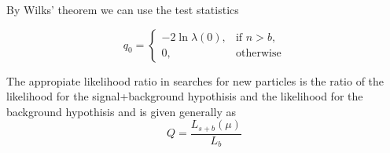 \documentclass[../../main/main.tex]{subfiles}
\begin{document}
By Wilks' theorem we can use the test statistics 

\begin{equation}
  \label{eq:wilks-test}
  q_0=\begin{cases}
             -2\ln \lambda(0), & \text{if \(n > b\),}\\
             0, & \text{otherwise}
           \end{cases}
\end{equation}

The appropiate likelihood ratio in searches for new particles is the ratio of the likelihood for the signal+background hypothisis and the likelihood for the background hypothisis and is given generally as
\begin{equation}
  \label{eq:discovery-likelihood-ratio}
  Q = \frac{L_{s+b}(\mu)}{L_b}
\end{equation}
\end{document}
